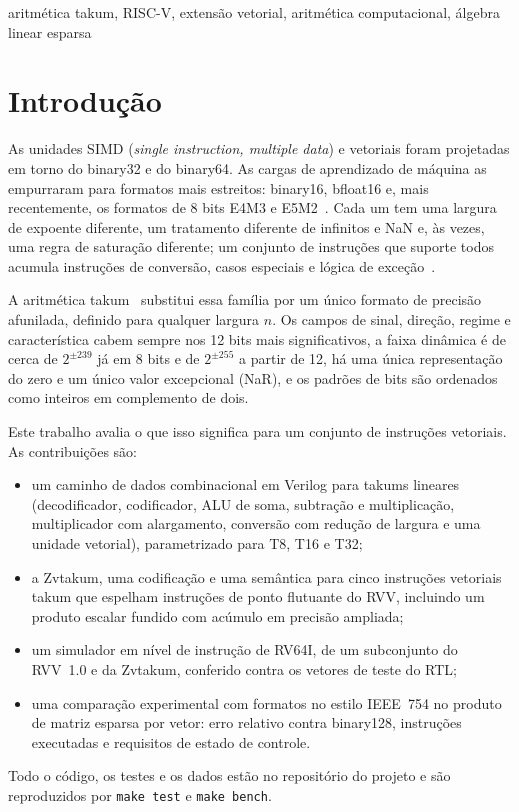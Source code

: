 \documentclass[conference]{IEEEtran}
\newcommand{\code}[1]{\texttt{#1}}
\begin{document}
\begin{IEEEkeywords}
aritmética takum, RISC-V, extensão vetorial, aritmética computacional, álgebra linear esparsa
\end{IEEEkeywords}

\section{Introdução}

As unidades SIMD (\emph{single instruction, multiple data}) e vetoriais foram projetadas em torno do
binary32 e do binary64. As cargas de aprendizado de máquina as empurraram para formatos mais estreitos:
binary16, bfloat16 e, mais recentemente, os formatos de 8 bits E4M3 e E5M2~\cite{ofp8}. Cada um tem uma
largura de expoente diferente, um tratamento diferente de infinitos e NaN e, às vezes, uma regra de
saturação diferente; um conjunto de instruções que suporte todos acumula instruções de conversão, casos
especiais e lógica de exceção~\cite{hunhold2025avx}.

A aritmética takum~\cite{hunhold2024takum} substitui essa família por um único formato de precisão
afunilada, definido para qualquer largura $n$. Os campos de sinal, direção, regime e característica cabem
sempre nos 12 bits mais significativos, a faixa dinâmica é de cerca de $2^{\pm 239}$ já em 8 bits e de $2^{\pm 255}$ a partir de 12, há uma
única representação do zero e um único valor excepcional (NaR), e os padrões de bits são ordenados como
inteiros em complemento de dois.

Este trabalho avalia o que isso significa para um conjunto de instruções vetoriais. As contribuições são:
\begin{itemize}
  \item um caminho de dados combinacional em Verilog para takums lineares (decodificador, codificador,
        ALU de soma, subtração e multiplicação, multiplicador com alargamento, conversão com redução de
        largura e uma unidade vetorial), parametrizado para T8, T16 e T32;
  \item a Zvtakum, uma codificação e uma semântica para cinco instruções vetoriais takum que espelham
        instruções de ponto flutuante do RVV, incluindo um produto escalar fundido com acúmulo em
        precisão ampliada;
  \item um simulador em nível de instrução de RV64I, de um subconjunto do RVV~1.0 e da Zvtakum,
        conferido contra os vetores de teste do RTL;
  \item uma comparação experimental com formatos no estilo IEEE~754 no produto de matriz esparsa por
        vetor: erro relativo contra binary128, instruções executadas e requisitos de estado de controle.
\end{itemize}
Todo o código, os testes e os dados estão no repositório do projeto e são reproduzidos por
\code{make test} e \code{make bench}.
\end{document}
